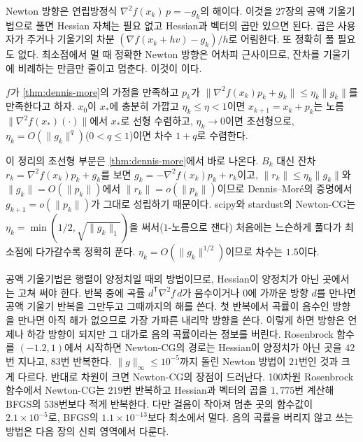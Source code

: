 Newton 방향은 연립방정식 $\nabla^2f(x_k)\,p=-g_k$의 해이다. 이것을 27장의 공액 기울기법으로 풀면 Hessian 자체는 필요 없고 Hessian과 벡터의 곱만 있으면 된다. 곱은 사용자가 주거나 기울기의 차분 $(\nabla f(x_k+hv)-g_k)/h$로 어림한다. 또 정확히 풀 필요도 없다. 최소점에서 멀 때 정확한 Newton 방향은 어차피 근사이므로, 잔차를 기울기에 비례하는 만큼만 줄이고 멈춘다. 이것이 이다.

\begin{theorem}
\label{thm:inexact-newton}
$f$가 \cref{thm:dennis-more}의 가정을 만족하고 $p_k$가 $\|\nabla^2f(x_k)p_k+g_k\|\le\eta_k\|g_k\|$를 만족한다고 하자. $x_0$이 $x_\ast$에 충분히 가깝고 $\eta_k\le\eta<1$이면 $x_{k+1}=x_k+p_k$는 노름 $\|\nabla^2f(x_\ast)(\cdot)\|$에서 $x_\ast$로 선형 수렴하고, $\eta_k\to0$이면 초선형으로, $\eta_k=O(\|g_k\|^q)$($0<q\le1$)이면 차수 $1+q$로 수렴한다.
\end{theorem}

이 정리\cite{dembo1982}의 초선형 부분은 \cref{thm:dennis-more}에서 바로 나온다. $B_k$ 대신 잔차 $r_k=\nabla^2f(x_k)p_k+g_k$를 보면 $g_k=-\nabla^2f(x_k)p_k+r_k$이고, $\|r_k\|\le\eta_k\|g_k\|$와 $\|g_k\|=O(\|p_k\|)$에서 $\|r_k\|=o(\|p_k\|)$이므로 Dennis--Moré의 증명에서 $g_{k+1}=o(\|p_k\|)$가 그대로 성립하기 때문이다. scipy와 stardust의 Newton-CG는 $\eta_k=\min(1/2,\sqrt{\|g_k\|_1})$을 써서($1$-노름으로 잰다) 처음에는 느슨하게 풀다가 최소점에 다가갈수록 정확히 푼다. $\eta_k=O(\|g_k\|^{1/2})$이므로 차수는 $1.5$이다.

공액 기울기법은 행렬이 양정치일 때의 방법이므로, Hessian이 양정치가 아닌 곳에서는 고쳐 써야 한다. 반복 중에 곡률 $d^{\mathsf T}\nabla^2f\,d$가 음수이거나 $0$에 가까운 방향 $d$를 만나면 공액 기울기 반복을 그만두고 그때까지의 해를 쓴다. 첫 반복에서 곡률이 음수인 방향을 만나면 아직 해가 없으므로 가장 가파른 내리막 방향을 쓴다. 이렇게 하면 방향은 언제나 하강 방향이 되지만 그 대가로 음의 곡률이라는 정보를 버린다. Rosenbrock 함수를 $(-1.2,1)$에서 시작하면 Newton-CG의 경로는 Hessian이 양정치가 아닌 곳을 $42$번 지나고, $83$번 반복한다. $\|g\|_\infty\le10^{-5}$까지 돌린 Newton 방법이 $21$번인 것과 크게 다르다. 반대로 차원이 크면 Newton-CG의 장점이 드러난다. 100차원 Rosenbrock 함수에서 Newton-CG는 $219$번 반복하고 Hessian과 벡터의 곱을 $1{,}775$번 계산해 BFGS의 $538$번보다 적게 반복한다. 다만 걸음이 작아져 멈춘 곳의 함수값이 $2.1\times10^{-5}$로, BFGS의 $1.1\times10^{-13}$보다 최소에서 멀다. 음의 곡률을 버리지 않고 쓰는 방법은 다음 장의 신뢰 영역에서 다룬다.

